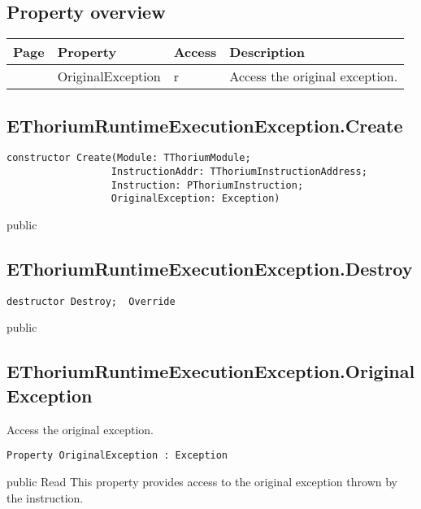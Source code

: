 \subsection{Property overview}
\label{thoriumcorepkg:thorium:ethoriumruntimeexecutionexception:properties}
\begin{tabularx}{\textwidth}{lllX}
Page & Property & Access & Description \\ \hline
\pageref{thoriumcorepkg:thorium:ethoriumruntimeexecutionexception:originalexception} & OriginalException & r & Access the original exception. \\
\hline
\end{tabularx}
\subsection{EThoriumRuntimeExecutionException.Create}
\label{thoriumcorepkg:thorium:ethoriumruntimeexecutionexception:create}
\begin{FPCList}
\Declaration 

\begin{verbatim}
constructor Create(Module: TThoriumModule;
                  InstructionAddr: TThoriumInstructionAddress;
                  Instruction: PThoriumInstruction;
                  OriginalException: Exception)
\end{verbatim}
\Visibility
public
\end{FPCList}
\subsection{EThoriumRuntimeExecutionException.Destroy}
\label{thoriumcorepkg:thorium:ethoriumruntimeexecutionexception:destroy}
\begin{FPCList}
\Declaration 

\begin{verbatim}
destructor Destroy;  Override
\end{verbatim}
\Visibility
public
\end{FPCList}
\subsection{EThoriumRuntimeExecutionException.OriginalException}
\label{thoriumcorepkg:thorium:ethoriumruntimeexecutionexception:originalexception}
\begin{FPCList}
\Synopsis
Access the original exception.\Declaration 

\begin{verbatim}
Property OriginalException : Exception
\end{verbatim}
\Visibility
public
\Access
Read
\Description
This property provides access to the original exception thrown by the instruction.\end{FPCList}

